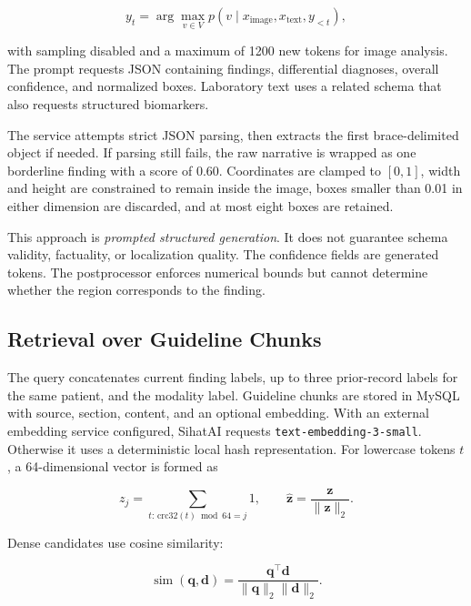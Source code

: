 \documentclass[conference]{IEEEtran}
\begin{document}
\begin{equation}
 y_t = \arg\max_{v \in V} p(v \mid x_\mathrm{image},x_\mathrm{text},y_{<t}),
\end{equation}

with sampling disabled and a maximum of 1200 new tokens for image analysis. The prompt requests JSON containing findings, differential diagnoses, overall confidence, and normalized boxes. Laboratory text uses a related schema that also requests structured biomarkers.

The service attempts strict JSON parsing, then extracts the first brace-delimited object if needed. If parsing still fails, the raw narrative is wrapped as one borderline finding with a score of 0.60. Coordinates are clamped to \([0,1]\), width and height are constrained to remain inside the image, boxes smaller than 0.01 in either dimension are discarded, and at most eight boxes are retained.

This approach is \emph{prompted structured generation}. It does not guarantee schema validity, factuality, or localization quality. The confidence fields are generated tokens. The postprocessor enforces numerical bounds but cannot determine whether the region corresponds to the finding.

\subsection{Retrieval over Guideline Chunks}

The query concatenates current finding labels, up to three prior-record labels for the same patient, and the modality label. Guideline chunks are stored in MySQL with source, section, content, and an optional embedding. With an external embedding service configured, SihatAI requests \texttt{text-embedding-3-small}. Otherwise it uses a deterministic local hash representation. For lowercase tokens \(t\), a 64-dimensional vector is formed as

\begin{equation}
  z_j = \sum_{t:\,\mathrm{crc32}(t)\bmod64=j} 1,\qquad
  \hat{\mathbf z} = \frac{\mathbf z}{\|\mathbf z\|_2}.
\end{equation}

Dense candidates use cosine similarity:

\begin{equation}
 \operatorname{sim}(\mathbf q,\mathbf d)=
 \frac{\mathbf q^\top\mathbf d}{\|\mathbf q\|_2\|\mathbf d\|_2}.
\end{equation}
\end{document}
